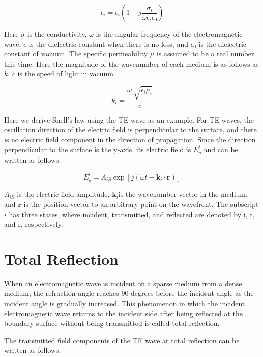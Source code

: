 \documentclass[a4paper,12pt]{report}
\begin{document}
\begin{equation}
  \dot{\epsilon_i} = \epsilon_i(1 - j\frac{\sigma_i}{\omega\epsilon_i\epsilon_0})
\end{equation}

Here $\sigma$ is the conductivity,
$\omega$ is the angular frequency of the electromagnetic wave,
$\epsilon$ is the dielectric constant when there is no loss, and
$\epsilon_0$ is the dielectric constant of vacuum.
The specific permeability $\mu$ is assumed to be a real number this time.
Here the magnitude of the wavenumber of each medium is as follows as $k$.
$c$ is the speed of light in vacuum.

\begin{equation}
  k_i = \frac{\omega\sqrt[]{\dot{\epsilon_i}\mu_i}}{c}
\end{equation}

Here we derive Snell's law using the TE wave as an example.
For TE waves,
the oscillation direction of the electric field is perpendicular to the surface,
and there is no electric field component in the direction of propagation.
Since the direction perpendicular to the surface is the y-axis,
its electric field is $E^i_y$ and can be written as follows:

\begin{equation}
  E^i_y = A_{iS}\exp[j(\omega t - \boldsymbol{k}_i\cdot\boldsymbol{r})]
\end{equation}

$A_{iS}$ is the electric field amplitude,
$\boldsymbol{k}_i$is the wavenumber vector in the medium, and
$\boldsymbol{r}$ is the position vector to an arbitrary point on the wavefront.
The subscript $i$ has three states,
where incident, transmitted, and reflected are denoted by i, t, and r, respectively.

\section{Total Reflection}

When an electromagnetic wave is incident on a sparse medium from a dense medium,
the refraction angle reaches 90 degrees before the incident angle
as the incident angle is gradually increased.
This phenomenon in which the incident electromagnetic wave
returns to the incident side after being reflected
at the boundary surface without being transmitted is called total reflection.

The transmitted field components of the TE wave at total reflection
can be written as follows.
\end{document}
